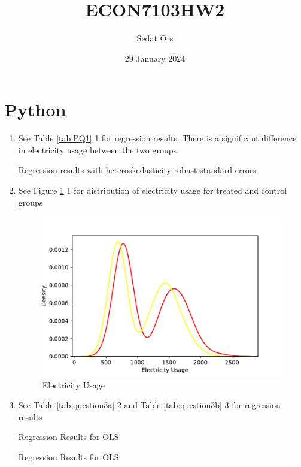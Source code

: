 \documentclass{article}
\title{ECON7103HW2}
\author{Sedat Ors}
\date{29 January 2024}
\begin{document}
\maketitle

\section{Python}
\begin{enumerate}
\item

See Table \ref{tab:PQ1} 1 for regression results. There is a significant difference in electricity usage between the two groups.

\begin{table}[ht]
    \centering
    
    \caption{Regression results with heteroskedasticity-robust standard errors.}
    \label{tab:PQ1}
\end{table}

\item 
See Figure \ref{fig:histogram1} 1 for distribution of electricity usage for treated and control groups
\vspace{0.5cm}

\begin{figure}[]
    \centering
     \includegraphics{HW2pyf.pdf}
    \caption{Electricity Usage}
    \label{fig:histogram1}
\end{figure}

\item 
\noindent See Table \ref{tab:question3a} 2 and Table \ref{tab:question3b} 3 for regression results
 \begin{table}[]
    \centering
    
    \caption{Regression Results for OLS}
    \label{tab:question3a}
\end{table}

\vspace{0.5cm}
\begin{table}[]
    \centering
    
    \caption{Regression Results for OLS}
    \label{tab:question3b}
\end{table}
\end{enumerate}
\end{document}
